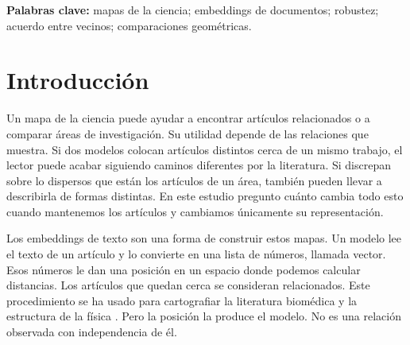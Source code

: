 \begin{abstract}
Los mapas de la ciencia usan las relaciones entre artículos para describir cómo se organiza la investigación. Cuando esas relaciones proceden de embeddings de texto, un modelo convierte cada artículo en una lista de números. \textquestiondown{}Otro modelo daría la misma imagen? Comparo diez modelos con una misma colección de 500.000 registros de OpenAlex, de 26 áreas y del período 2000--2024. Examino la organización general, qué artículos quedan más cerca unos de otros y cómo se distribuyen dentro de cada área. Los modelos comparten una organización general, pero, al buscar dentro de la misma área y período, dos modelos conservan en promedio unos ocho de los mismos 25 artículos más cercanos. Usar solo el título, en lugar del título y el resumen, cambia esos vecinos casi tanto como cambiar el modelo. En una exploración posterior, los modelos también discrepan sobre cuál de dos áreas tiene representaciones más dispersas. Esas respuestas opuestas pueden repetirse al seleccionar otros artículos, aunque muchas diferencias son pequeñas y las decisiones de procesamiento importan. Repetir un resultado con otros artículos no garantiza, por tanto, que otro modelo lo respalde. Los resultados identifican dependencia de la representación; no establecen qué modelo describe mejor la investigación.
\end{abstract}
\textbf{Palabras clave:} mapas de la ciencia; embeddings de documentos; robustez; acuerdo entre vecinos; comparaciones geométricas.

\section{Introducción}
Un mapa de la ciencia puede ayudar a encontrar artículos relacionados o a comparar áreas de investigación. Su utilidad depende de las relaciones que muestra. Si dos modelos colocan artículos distintos cerca de un mismo trabajo, el lector puede acabar siguiendo caminos diferentes por la literatura. Si discrepan sobre lo dispersos que están los artículos de un área, también pueden llevar a describirla de formas distintas. En este estudio pregunto cuánto cambia todo esto cuando mantenemos los artículos y cambiamos únicamente su representación.

Los embeddings de texto son una forma de construir estos mapas. Un modelo lee el texto de un artículo y lo convierte en una lista de números, llamada vector. Esos números le dan una posición en un espacio donde podemos calcular distancias. Los artículos que quedan cerca se consideran relacionados. Este procedimiento se ha usado para cartografiar la literatura biomédica y la estructura de la física \citep{refbe130e2973,refc0e2cc29e0}. Pero la posición la produce el modelo. No es una relación observada con independencia de él.


